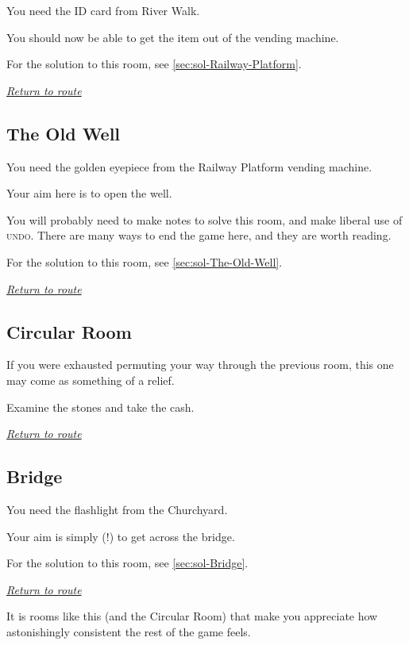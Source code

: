 \documentclass[a5paper]{extarticle}
\begin{document}
You need the ID card from River Walk.

You should now be able to get the item out of the vending machine.

For the solution to this room, see \cref{sec:sol-Railway-Platform}.

\hyperref[sec:route-2]{\emph{Return to route}}

\newpage
\subsection{The Old Well}\label{sec:req-The-Old-Well}

You need the golden eyepiece from the Railway Platform vending machine.

Your aim here is to open the well.

You will probably need to make notes to solve this room,
and make liberal use of \textsc{undo}.
There are many ways to end the game here, and they are worth reading.

For the solution to this room, see \cref{sec:sol-The-Old-Well}.

\hyperref[sec:route-2]{\emph{Return to route}}

\newpage
\subsection{Circular Room}\label{sec:req-Circular-Room}

If you were exhausted permuting your way through the previous room,
this one may come as something of a relief.

Examine the stones and take the cash.

\hyperref[sec:route-2]{\emph{Return to route}}

\newpage
\subsection{Bridge}\label{sec:req-Bridge}

You need the flashlight from the Churchyard.

Your aim is simply (!) to get across the bridge.

For the solution to this room, see \cref{sec:sol-Bridge}.

\hyperref[sec:route-2]{\emph{Return to route}}

It is rooms like this (and the Circular Room) that make you appreciate
how astonishingly consistent the rest of the game feels.
\end{document}
